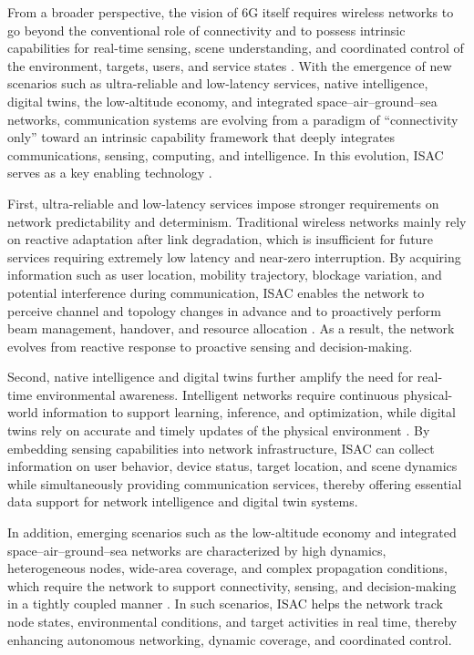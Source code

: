 From a broader perspective, the vision of 6G itself requires wireless networks to go beyond the conventional role of connectivity and to possess intrinsic capabilities for real-time sensing, scene understanding, and coordinated control of the environment, targets, users, and service states \cite{Saad2020Vision6G,IMT2030Framework}. With the emergence of new scenarios such as ultra-reliable and low-latency services, native intelligence, digital twins, the low-altitude economy, and integrated space--air--ground--sea networks, communication systems are evolving from a paradigm of ``connectivity only'' toward an intrinsic capability framework that deeply integrates communications, sensing, computing, and intelligence. In this evolution, ISAC serves as a key enabling technology \cite{Gonzalez2024integrated,Liu2022ISAC}.

First, ultra-reliable and low-latency services impose stronger requirements on network predictability and determinism. Traditional wireless networks mainly rely on reactive adaptation after link degradation, which is insufficient for future services requiring extremely low latency and near-zero interruption. By acquiring information such as user location, mobility trajectory, blockage variation, and potential interference during communication, ISAC enables the network to perceive channel and topology changes in advance and to proactively perform beam management, handover, and resource allocation \cite{Liu2022ISAC,Zhang2020perceptive}. As a result, the network evolves from reactive response to proactive sensing and decision-making.

Second, native intelligence and digital twins further amplify the need for real-time environmental awareness. Intelligent networks require continuous physical-world information to support learning, inference, and optimization, while digital twins rely on accurate and timely updates of the physical environment \cite{Saad2020Vision6G,Khan2022digital}. By embedding sensing capabilities into network infrastructure, ISAC can collect information on user behavior, device status, target location, and scene dynamics while simultaneously providing communication services, thereby offering essential data support for network intelligence and digital twin systems.

In addition, emerging scenarios such as the low-altitude economy and integrated space--air--ground--sea networks are characterized by high dynamics, heterogeneous nodes, wide-area coverage, and complex propagation conditions, which require the network to support connectivity, sensing, and decision-making in a tightly coupled manner \cite{Saad2020Vision6G,IMT2030Framework}. In such scenarios, ISAC helps the network track node states, environmental conditions, and target activities in real time, thereby enhancing autonomous networking, dynamic coverage, and coordinated control.

